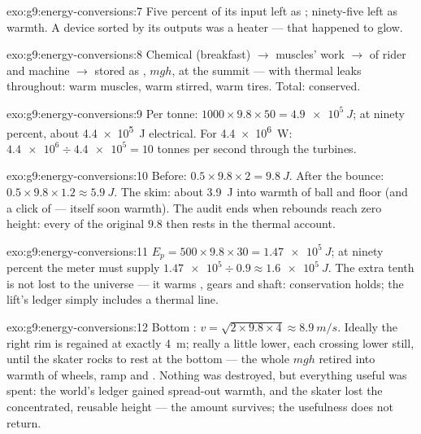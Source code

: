 \begin{solution}{exo:g9:energy-conversions:7}
Five percent of its input left as ; ninety-five left as
warmth. A device sorted by its outputs was a heater --- that
happened to glow.
\end{solution}

\begin{solution}{exo:g9:energy-conversions:8}
Chemical (breakfast) $\to$ muscles' work $\to$ 
of rider and machine $\to$ stored as , $m g
h$, at the summit --- with thermal leaks throughout: warm
muscles, warm  stirred, warm tires. Total: conserved.
\end{solution}

\begin{solution}{exo:g9:energy-conversions:9}
Per tonne: $1000 \times 9.8 \times 50 = \qty{4.9e5}{J}$;
at ninety percent, about \qty{4.4e5}{J} electrical. For
\qty{4.4e6}{W}: $\num{4.4e6} \div \num{4.4e5} = 10$ tonnes
per second through the turbines.
\end{solution}

\begin{solution}{exo:g9:energy-conversions:10}
Before: $0.5 \times 9.8 \times 2 = \qty{9.8}{J}$. After the
bounce: $0.5 \times 9.8 \times 1.2 \approx \qty{5.9}{J}$. The
skim: about \qty{3.9}{J} into warmth of ball and floor (and a
click of  --- itself soon warmth). The audit ends when
rebounds reach zero height: every  of the original $9.8$
then rests in the thermal account.
\end{solution}

\begin{solution}{exo:g9:energy-conversions:11}
$E_p = 500 \times 9.8 \times 30 = \qty{1.47e5}{J}$; at ninety
percent the meter must supply $\num{1.47e5} \div 0.9 \approx
\qty{1.6e5}{J}$. The extra tenth is not lost to the universe
--- it warms , gears and shaft: conservation holds; the
lift's ledger simply includes a thermal line.
\end{solution}

\begin{solution}{exo:g9:energy-conversions:12}
Bottom : $v = \sqrt{2 \times 9.8 \times 4} \approx
\qty{8.9}{m/s}$. Ideally the right rim is regained at
exactly \qty{4}{m}; really a little lower, each crossing
lower still, until the skater rocks to rest at the bottom
--- the whole $m g h$ retired into warmth of wheels, ramp
and . Nothing was destroyed, but everything useful was
spent: the world's ledger gained spread-out warmth, and the
skater lost the concentrated, reusable height --- the
amount survives; the usefulness does not return.
\end{solution}

